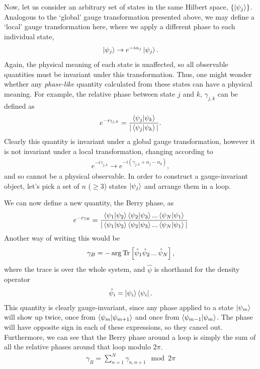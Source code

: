 Now, let us consider an arbitrary set of states in the same Hilbert space, $\{ \ket{\psi_j}\}$. Analogous to the `global' gauge transformation presented above, we may define a `local' gauge transformation here, where we apply a different phase to each individual state,
\begin{align}
    \ket{\psi_j} \rightarrow e^{-i\alpha_j}\ket{\psi_j}.
\end{align}
Again, the physical meaning of each state is unaffected, so all observable quantities must be invariant under this transformation. Thus, one might wonder whether any \textit{phase-like} quantity calculated from these states can have a physical meaning. For example, the relative phase between state $j$ and $k$, $\gamma_{j,k}$ can be defined as
\begin{align}
    e^{-i\gamma_{j,k}} = \frac{\braket{\psi_j|\psi_k}}{|\braket{\psi_j|\psi_k}|}.
\end{align}
Clearly this quantity is invariant under a global gauge transformation, however it is not invariant under a local transformation, changing according to
\begin{align}
    e^{-i\gamma_{j,k}} \rightarrow e^{-i(\gamma_{j,k}+\alpha_j - \alpha_k)},
\end{align}
and so cannot be a physical observable. In order to construct a gauge-invariant object, let's pick a set of $n$ ($\geq 3$) states $\ket{\psi_j}$ and arrange them in a loop.
\begin{center}
    
\end{center}
We can now define a new quantity, the Berry phase, as
\begin{align}
    e^{-i \gamma_{B}} = \frac{\braket{\psi_1|\psi_2}\braket{\psi_2|\psi_3}...\braket{\psi_N|\psi_1}}{|\braket{\psi_1|\psi_2}\braket{\psi_2|\psi_3}...\braket{\psi_N|\psi_1}|}
\end{align}
Another way of writing this would be
\begin{align}  
    \gamma_{B} = -\arg \textup{Tr} 
    \left [ \hat\psi_{1} \hat\psi_{2} 
    \, ... \,
    \hat\psi_{N} \right ],
\end{align}
where the trace is over the whole system, and $\hat \psi$ is shorthand for the density operator
\begin{align}
    \hat \psi_{i} = \ket{\psi_{i}}\bra{\psi_{i}}.
\end{align}
This quantity is clearly gauge-invariant, since any phase applied to a state $\ket{\psi_m}$ will show up twice, once from $\braket{\psi_m|\psi_{m+1}}$ and once from $\braket{\psi_{m-1}|\psi_{m}}$. The phase will have opposite sign in each of these expressions, so they cancel out. Furthermore, we can see that the Berry phase around a loop is simply the sum of all the relative phases around that loop modulo $2\pi$.
\begin{align}\label{eqn:discrete_berry_sum}
	\gamma_B = \sum_{n=1}^N \gamma_{n,n+1} \mod 2\pi
\end{align}



